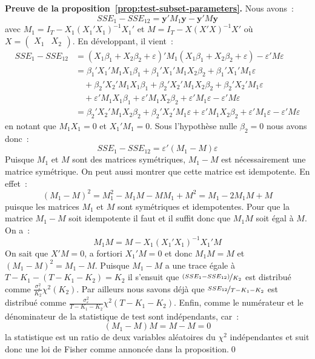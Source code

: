 \documentclass[10pt]{beamer}
\begin{document}
\begin{notes}

  \textbf{Preuve de la proposition~\ref{prop:test-subset-parameters}.} Nous avons~:
  \[
    SSE_1 - SSE_{12} = \mathbf y' M_1\mathbf y - \mathbf y' M \mathbf y
  \]
  avec $M_1 = I_{T}-X_1(X_1'X_1)^{-1}X_1'$ et $M = I_{T}-X(X'X)^{-1}X'$ où  $X = \begin{pmatrix}X_1 & X_2\end{pmatrix}$. En développant, il vient~:
  \[
    \begin{split}
      SSE_1 - SSE_{12} &= \left(X_1\beta_1 + X_2\beta_2 + \varepsilon\right)'M_1\left(X_1\beta_1 + X_2\beta_2 + \varepsilon\right) - \varepsilon'M\varepsilon\\
                       &= \beta_1'X_1'M_1X_1\beta_1 + \beta_1'X_1'M_1X_2\beta_2+ \beta_1'X_1'M_1\varepsilon\\
                       &\quad + \beta_2'X_2'M_1X_1\beta_1 + \beta_2'X_2'M_1X_2\beta_2+ \beta_2'X_2'M_1\varepsilon\\
                       &\quad + \varepsilon'M_1X_1\beta_1 + \varepsilon'M_1X_2\beta_2+ \varepsilon'M_1\varepsilon - \varepsilon'M\varepsilon\\
      &= \beta_2'X_2'M_1X_2\beta_2 + \beta_2'X_2'M_1\varepsilon + \varepsilon'M_1X_2\beta_2 + \varepsilon'M_1\varepsilon - \varepsilon'M\varepsilon
    \end{split}
  \]
  en notant que $M_1X_1=0$ et $X_1'M_1 = 0$. Sous l'hypothèse nulle $\beta_2=0$ nous avons donc~:
  \[
    SSE_1 - SSE_{12} = \varepsilon'\left( M_1 - M \right)\varepsilon
  \]
  Puisque $M_1$ et $M$ sont des matrices symétriques, $M_1-M$ est nécessairement une matrice symétrique. On peut aussi montrer que cette matrice est idempotente. En effet~:
  \[
    \left( M_1-M \right)^2 = M_1^2 - M_1M - MM_1 + M^2 = M_1 - 2M_1M + M
  \]
  puisque les matrices $M_1$ et $M$ sont symétriques et idempotentes. Pour que la matrice $M_1-M$ soit idempotente il faut et il suffit donc que $M_1M$ soit égal à $M$. On a~:
  \[
    M_1M = M - X_1(X_1'X_1)^{-1}X_1'M
  \]
  On sait que $X'M=0$, a fortiori $X_1'M = 0$ et donc $M_1M=M$ et $\left(M_1-M\right)^2=M_1-M$. Puisque $M_1-M$ a une trace égale à $T-K_1-(T-K_1-K_2)=K_2$ il s'ensuit que $\nicefrac{\left(SSE_1-SSE_{12} \right)}{K_2}$ est distribué comme $\frac{\sigma_{\varepsilon}^2}{K_2}\chi^2(K_2)$. Par ailleurs nous savons déjà que $\nicefrac{SSE_{12}}{T-K_1-K_2}$ est distribué comme $\frac{\sigma_{\varepsilon}^2}{T-K_1-K_2}\chi^2(T-K_1-K_2)$. Enfin, comme le numérateur et le dénominateur de la statistique de test sont indépendants, car~:
  \[
    (M_1-M)M = M - M = 0
  \]
la statistique est un ratio de deux variables aléatoires du $\chi^2$ indépendantes et suit donc une loi de Fisher comme annoncée dans la proposition.\qed

\end{notes}
\end{document}
